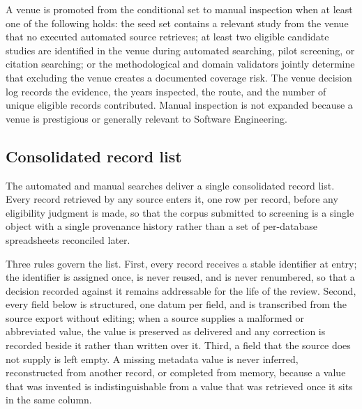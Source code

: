 A venue is promoted from the conditional set to manual inspection when at least one of the following holds: the seed set contains a relevant study from the venue that no executed automated source retrieves; at least two eligible candidate studies are identified in the venue during automated searching, pilot screening, or citation searching; or the methodological and domain validators jointly determine that excluding the venue creates a documented coverage risk. The venue decision log records the evidence, the years inspected, the route, and the number of unique eligible records contributed. Manual inspection is not expanded because a venue is prestigious or generally relevant to Software Engineering.

\subsection{Consolidated record list}
\label{sec:protocol_record_list}

The automated and manual searches deliver a single consolidated record list. Every record retrieved by any source enters it, one row per record, before any eligibility judgment is made, so that the corpus submitted to screening is a single object with a single provenance history rather than a set of per-database spreadsheets reconciled later.

Three rules govern the list. First, every record receives a stable identifier at entry; the identifier is assigned once, is never reused, and is never renumbered, so that a decision recorded against it remains addressable for the life of the review. Second, every field below is structured, one datum per field, and is transcribed from the source export without editing; when a source supplies a malformed or abbreviated value, the value is preserved as delivered and any correction is recorded beside it rather than written over it. Third, a field that the source does not supply is left empty. A missing metadata value is never inferred, reconstructed from another record, or completed from memory, because a value that was invented is indistinguishable from a value that was retrieved once it sits in the same column.

